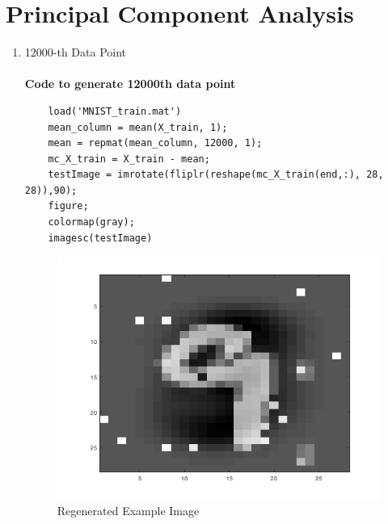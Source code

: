 \documentclass[english]{article}
\begin{document}
\section{Principal Component Analysis}
\begin{enumerate}
    \item 12000-th Data Point \\ \\
    \textbf{Code to generate 12000th data point}
    \begin{verbatim}
    load('MNIST_train.mat')
    mean_column = mean(X_train, 1);
    mean = repmat(mean_column, 12000, 1);
    mc_X_train = X_train - mean;
    testImage = imrotate(fliplr(reshape(mc_X_train(end,:), 28, 28)),90);
    figure;
    colormap(gray);
    imagesc(testImage)
    \end{verbatim}
    
    \begin{figure}[H]
    \centering
    \includegraphics[scale = 0.45]{fig31}
    \caption{Regenerated Example Image}
    \label{fig:fig31}
    \end{figure}
    

\end{enumerate}
\end{document}
